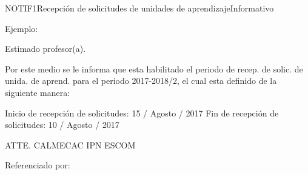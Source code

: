 \begin{mensaje}{NOTIF1}{Recepción de solicitudes de unidades de aprendizaje}{Informativo}
	\item[Ejemplo:] 

		Estimado profesor(a).

		Por este medio se le informa que esta habilitado el periodo de recep. de solic. de unida. de aprend. para el periodo 2017-2018/2, el cual esta definido de la siguiente manera:

		Inicio de recepción de solicitudes: 15 / Agosto / 2017
		Fin de recepción de solicitudes: 10 / Agosto / 2017

		ATTE.
		CALMECAC
		IPN
		ESCOM

	\item[Referenciado por:] 
	
\end{mensaje}
